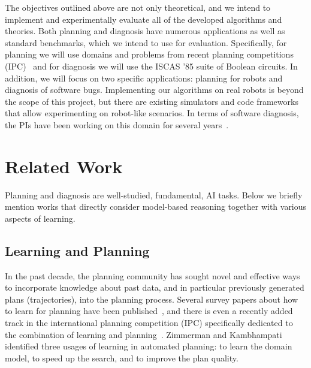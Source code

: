 \documentclass[12pt]{article}
\newcommand{\note}[1]{\textbf{\textit{#1}}}
\begin{document}
The objectives outlined above are not only theoretical, and we intend to implement and experimentally evaluate all of the developed algorithms and theories. 
Both planning and diagnosis have numerous applications as well as standard benchmarks, which we intend to use for evaluation. Specifically, for planning we will use domains and problems from recent planning competitions (IPC)~\cite{vallati20152014} and for diagnosis we will use the ISCAS '85 suite of Boolean circuits. In addition, we will focus on two specific applications: %
planning for robots and diagnosis of software bugs. 
Implementing our algorithms on real robots is beyond the scope of this project, but there are existing simulators and code frameworks that allow experimenting on robot-like scenarios. In terms of software diagnosis, the PIs have been working on this domain for several years~\cite{Zamir2014UsingMD,elmishali2016dataAugmented,juba2015ndss}. 



\section{Related Work}
Planning and diagnosis are well-studied, fundamental, AI tasks. %
Below we briefly mention works that directly consider model-based reasoning together with various aspects of learning. 

\subsection{Learning and Planning}


In the past decade, the planning community has sought novel and effective ways to incorporate knowledge about past data, and in particular previously generated plans (trajectories), into the planning process. 
Several survey papers about how to learn for planning have been published~\cite{minton2014machine,zimmerman2003learning,jimenez2012review}, 
and there is even a recently added track in the international planning competition (IPC) specifically dedicated to the combination of learning and planning~\cite{fern2011first}. 
Zimmerman and Kambhampati~\cite{zimmerman2003learning} identified three usages of learning in automated planning: to learn the domain model, to speed up the search, and to improve the plan quality. 
\end{document}
